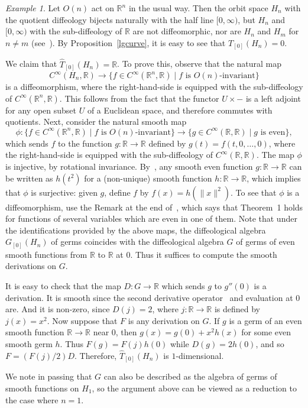 \documentclass[12pt]{amsart}
\theoremstyle{remark}
\newtheorem{ex}[de]{Example}
\newcommand{\ra}{\to}
\newcommand{\lra}{\longrightarrow}
\def \R{\mathbb{R}}
\begin{document}
\begin{ex}\label{halfline:quotient}
Let $O(n)$ act on $\R^n$ in the usual way.
Then the orbit space $H_n$ with the quotient diffeology bijects naturally with
the half line $[0,\infty)$,
but $H_n$ and $[0,\infty)$ with the sub-diffeology of $\R$ are not diffeomorphic,
nor are $H_n$ and $H_m$ for $n \neq m$ (see~\cite{I2}).
By Proposition~\ref{lgcurve}, it is easy to see that $T_{[0]}(H_n)=0$.

We claim that $\hat{T}_{[0]}(H_n)=\R$.
To prove this, observe that the natural map
\[ C^\infty(H_n, \R) \lra \{ f \in C^\infty(\R^n,\R) \mid f \text{ is $O(n)$-invariant} \} \]
is a diffeomorphism, where the right-hand-side is equipped with the sub-diffeology of $C^\infty(\R^n,\R)$.
This follows from the fact that the functor $U \times -$ is a left adjoint
for any open subset $U$ of a Euclidean space, and
therefore commutes with quotients.
Next, consider the natural smooth map
\[ \phi : \{ f \in C^\infty(\R^n, \R) \mid f \text{ is $O(n)$-invariant} \} \lra
          \{ g \in C^\infty(\R,   \R) \mid g \text{ is even} \} , \]
which sends $f$ to the function $g : \R \to \R$ defined by $g(t) = f(t,0,\ldots,0)$,
where the right-hand-side is equipped with the sub-diffeology of $C^\infty(\R,\R)$.
The map $\phi$ is injective, by rotational invariance.
By~\cite[Theorem~1]{Wh}, any smooth even function $g : \R \to \R$ can be
written as $h(t^2)$ for a (non-unique) smooth function $h : \R \to \R$,
which implies that $\phi$ is surjective: given $g$, define $f$ by $f(x) = h(\|x\|^2)$.
To see that $\phi$ is a diffeomorphism, use the Remark at the end of~\cite{Wh},
which says that Theorem~1 holds for functions of several variables which are
even in one of them.
Note that under the identifications provided by the above maps,
the diffeological algebra $G_{[0]}(H_n)$ of germs coincides
with the diffeological algebra $G$ of germs of even smooth functions from $\R$ to $\R$ at $0$.
Thus it suffices to compute the smooth derivations on $G$.

It is easy to check that the map $D : G \to \R$ which sends $g$ to $g''(0)$ is
a derivation.
It is smooth since the second derivative operator~\cite[Lemma~4.3]{CSW} and
evaluation at $0$ are.
And it is non-zero, since $D(j) = 2$,
where $j: \R \ra \R$ is defined by $j(x) = x^2$.
Now suppose that $F$ is any derivation on $G$.
If $g$ is a germ of an even smooth function $\R \to \R$ near $0$,
then $g(x) = g(0) + x^2 h(x)$ for some even smooth germ $h$.
Thus $F(g) = F(j) h(0)$ while $D(g) = 2 h(0)$, and so
$F = (F(j)/2) D$.
Therefore, $\hat{T}_{[0]}(H_n)$ is $1$-dimensional.

We note in passing that $G$ can also be described as the algebra of germs
of smooth functions on $H_1$, so the argument above can be viewed as a
reduction to the case where $n = 1$.
\end{ex}
\end{document}
